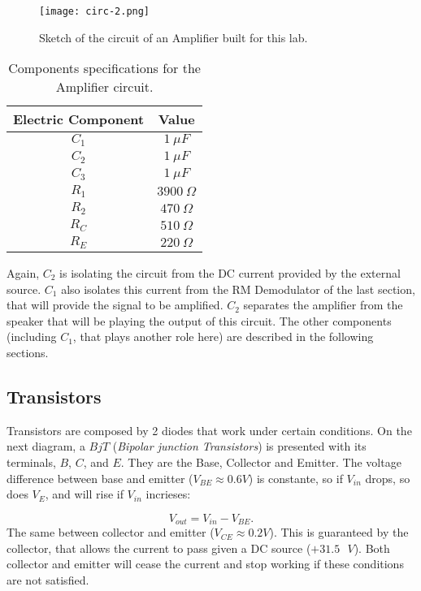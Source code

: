 \documentclass{article}
\begin{document}
\begin{figure}[H]
\center
\texttt{[image: circ-2.png]}
\caption {Sketch of the circuit of an Amplifier built for this lab.} 
\label{circuit2}
\end{figure}

\begin{table}[H]
\center
\begin{tabular}{|c|c|}
\hline
Electric Component    &   Value    \\ 
\hline
$C_{1}$ & $1 \ \mu F$ \\ 
\hline
$C_{2}$ & $1 \ \mu F$ \\ 
\hline
$C_{3}$ & $1 \ \mu F$ \\ 
\hline
$R_{1}$ & $3900 \ \Omega$ \\ 
\hline
$R_{2}$ & $470 \ \Omega$ \\ 
\hline
$R_{C}$ & $510 \ \Omega$ \\ 
\hline
$R_{E}$ & $220 \ \Omega$ \\ 
\hline
\end{tabular}
\caption{Components specifications for the Amplifier circuit.} 
\label{tab:1}
\end{table}

Again, $C_{2}$ is isolating the circuit from the DC current
provided by the external source. $C_{1}$ also isolates this current from the
RM Demodulator of the last section, that will provide the signal to be
amplified. $C_{2}$ separates the amplifier from the speaker that will be
playing the output of this circuit. The other components (including
$C_{1}$, that plays another role here) are described
in the following sections.

\subsection{Transistors}

Transistors are composed by 2 diodes that work under certain
conditions. On the next diagram, a $BjT$ (\emph{Bipolar junction Transistors}) is presented with its terminals, $B$, $C$, and $E$. They are the Base, Collector and Emitter. The voltage difference between base and emitter ($V_{BE} \approx 0.6V$) is constante, so if $V_{in}$ drops, so does $V_{E}$, and will rise if $V_{in}$ incrieses:

\begin{equation}
V_{out}=V_{in}-V_{BE}.
\label{V}
\end{equation}
The same between collector and emitter ($V_{CE} \approx 0.2V$). This is guaranteed by the collector, that allows the current to pass given a DC source ($+31.5 \text{ }V$). Both collector and emitter will cease the current and stop working if these conditions are not satisfied.
\end{document}
